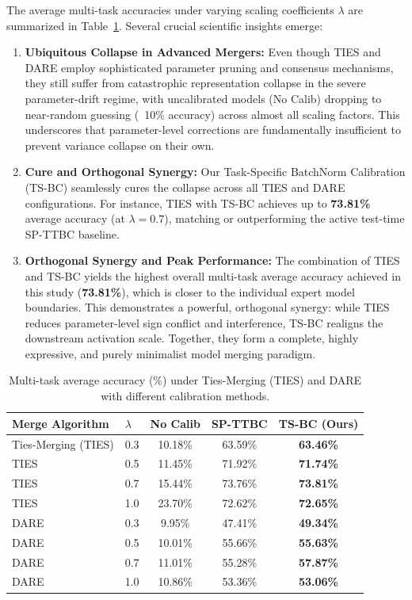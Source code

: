\documentclass{article}
\theoremstyle{plain}
\theoremstyle{definition}
\theoremstyle{remark}
\begin{document}
The average multi-task accuracies under varying scaling coefficients $\lambda$ are summarized in Table~\ref{tab:ties_dare}. Several crucial scientific insights emerge:
\begin{enumerate}
\item \textbf{Ubiquitous Collapse in Advanced Mergers:} Even though TIES and DARE employ sophisticated parameter pruning and consensus mechanisms, they still suffer from catastrophic representation collapse in the severe parameter-drift regime, with uncalibrated models (No Calib) dropping to near-random guessing (~10\% accuracy) across almost all scaling factors. This underscores that parameter-level corrections are fundamentally insufficient to prevent variance collapse on their own.
\item \textbf{Cure and Orthogonal Synergy:} Our Task-Specific BatchNorm Calibration (TS-BC) seamlessly cures the collapse across all TIES and DARE configurations. For instance, TIES with TS-BC achieves up to \textbf{73.81\%} average accuracy (at $\lambda=0.7$), matching or outperforming the active test-time SP-TTBC baseline.
\item \textbf{Orthogonal Synergy and Peak Performance:} The combination of TIES and TS-BC yields the highest overall multi-task average accuracy achieved in this study (\textbf{73.81\%}), which is closer to the individual expert model boundaries. This demonstrates a powerful, orthogonal synergy: while TIES reduces parameter-level sign conflict and interference, TS-BC realigns the downstream activation scale. Together, they form a complete, highly expressive, and purely minimalist model merging paradigm.
\end{enumerate}

\begin{table}[t]
\caption{Multi-task average accuracy (\%) under Ties-Merging (TIES) and DARE with different calibration methods.}
\label{tab:ties_dare}
\vskip 0.15in
\begin{center}
\begin{small}
\begin{tabular}{llccc}
\toprule
Merge Algorithm & $\lambda$ & No Calib & SP-TTBC & TS-BC (Ours) \\
\midrule
Ties-Merging (TIES) & 0.3 & 10.18\% & 63.59\% & \textbf{63.46\%} \\
TIES & 0.5 & 11.45\% & 71.92\% & \textbf{71.74\%} \\
TIES & 0.7 & 15.44\% & 73.76\% & \textbf{73.81\%} \\
TIES & 1.0 & 23.70\% & 72.62\% & \textbf{72.65\%} \\
\midrule
DARE & 0.3 & 9.95\% & 47.41\% & \textbf{49.34\%} \\
DARE & 0.5 & 10.01\% & 55.66\% & \textbf{55.63\%} \\
DARE & 0.7 & 11.01\% & 55.28\% & \textbf{57.87\%} \\
DARE & 1.0 & 10.86\% & 53.36\% & \textbf{53.06\%} \\
\bottomrule
\end{tabular}
\end{small}
\end{center}
\vskip -0.1in
\end{table}
\end{document}

